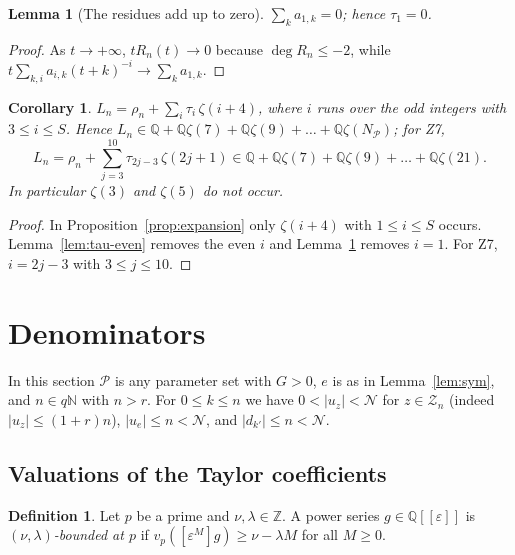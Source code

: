 \documentclass[11pt]{amsart}
\newtheorem{lemma}[theorem]{Lemma}
\newtheorem{corollary}[theorem]{Corollary}
\theoremstyle{definition}
\newtheorem{definition}[theorem]{Definition}
\theoremstyle{remark}
\numberwithin{equation}{section}
\newcommand{\NN}{\mathbb{N}}
\newcommand{\ZZ}{\mathbb{Z}}
\newcommand{\QQ}{\mathbb{Q}}
\newcommand{\cN}{\mathcal{N}}
\newcommand{\cP}{\mathcal{P}}
\newcommand{\eps}{\varepsilon}
\begin{document}
\begin{lemma}[The residues add up to zero]\label{lem:tau1}
$\sum_ka_{1,k}=0$; hence $\tau_1=0$.
\end{lemma}

\begin{proof}
As $t\to+\infty$, $tR_n(t)\to0$ because $\deg R_n\le-2$, while $t\sum_{k,i}a_{i,k}(t+k)^{-i}\to\sum_ka_{1,k}$.
\end{proof}

\begin{corollary}\label{cor:form}
$L_n=\rho_n+\sum_{i}\tau_i\,\zeta(i+4)$, where $i$ runs over the odd integers with $3\le i\le S$. Hence
$L_n\in\QQ+\QQ\zeta(7)+\QQ\zeta(9)+\dots+\QQ\zeta(N_\cP)$; for Z7,
\[
  L_n=\rho_n+\sum_{j=3}^{10}\tau_{2j-3}\,\zeta(2j+1)\in\QQ+\QQ\zeta(7)+\QQ\zeta(9)+\dots+\QQ\zeta(21).
\]
In particular $\zeta(3)$ and $\zeta(5)$ do not occur.
\end{corollary}

\begin{proof}
In Proposition~\ref{prop:expansion} only $\zeta(i+4)$ with $1\le i\le S$ occurs. Lemma~\ref{lem:tau-even} removes
the even $i$ and Lemma~\ref{lem:tau1} removes $i=1$. For Z7, $i=2j-3$ with $3\le j\le10$.
\end{proof}

\section{Denominators}\label{sec:arith}

In this section $\cP$ is any parameter set with $G>0$, $e$ is as in Lemma~\ref{lem:sym}, and $n\in q\NN$ with
$n>r$. For $0\le k\le n$ we have $0<|u_z|<\cN$ for $z\in\mathcal Z_n$ (indeed $|u_z|\le(1+r)n$),
$|u_e|\le n<\cN$, and $|d_{k'}|\le n<\cN$.

\subsection{Valuations of the Taylor coefficients}

\begin{definition}
Let $p$ be a prime and $\nu,\lambda\in\ZZ$. A power series $g\in\QQ[[\eps]]$ is
\emph{$(\nu,\lambda)$-bounded at $p$} if $v_p([\eps^M]g)\ge \nu-\lambda M$ for all $M\ge0$.
\end{definition}
\end{document}
